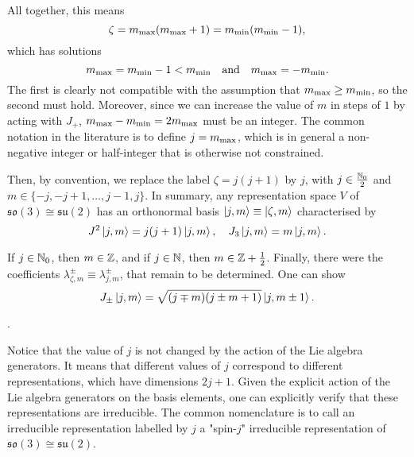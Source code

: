 All together, this means
\begin{equation}
    \zeta = m_\textup{max} (m_\textup{max} + 1) = m_\textup{min} (m_\textup{min} - 1),
\end{equation}
which has solutions
\begin{equation*}
    m_\textup{max} = m_\textup{min} - 1 < m_\textup{min} \quad \textup{and} \quad m_\textup{max} = - m_\textup{min}.
\end{equation*}
The first is clearly not compatible with the assumption that $m_\textup{max} \geq m_\textup{min}$, so the second must hold. Moreover, since we can increase the value of $m$ in steps of $1$ by acting with $J_+$, $m_\textup{max} - m_\textup{min} = 2 m_\textup{max}$ must be an integer. The common notation in the literature is to define $j = m_\textup{max}$, which is in general a non-negative integer or half-integer that is otherwise not constrained.

Then, by convention, we replace the label $\zeta = j (j+1)$ by $j$, with $j \in \frac{\mathbb{N}_0}{2}$ and $m \in \{ -j, -j+1, \dots, j-1, j \}$. In summary, any representation space $V$ of $\mathfrak{so}(3) \cong \mathfrak{su}(2)$ has an orthonormal basis $\ket{j,m} \equiv \ket{\zeta, m}$ characterised by
\begin{equation}
    J^2 \ket{j,m} = j(j+1) \ket{j,m}, \quad J_3 \ket{j,m} = m \ket{j,m} .
\end{equation}

If $j \in \mathbb{N}_0$, then $m \in \mathbb{Z}$, and if $j \in \mathbb{N}$, then $m \in \mathbb{Z} + \frac{1}{2}$. Finally, there were the coefficients $\lambda^\pm_{\zeta, m} \equiv \lambda^\pm_{j,m}$, that remain to be determined. One can show
\begin{equation}
    J_\pm \ket{j,m} = \sqrt{(j \mp m)(j \pm m + 1)} \ket{j,m \pm 1} .
\end{equation}
\begin{mdframed}
\begin{innerproof}
    .
\end{innerproof}
\end{mdframed}

Notice that the value of $j$ is not changed by the action of the Lie algebra generators. It means that different values of $j$ correspond to different representations, which have dimensions $2j +1$. Given the explicit action of the Lie algebra generators on the basis elements, one can explicitly verify that these representations are irreducible. The common nomenclature is to call an irreducible representation labelled by $j$ a "spin-$j$" irreducible representation of $\mathfrak{so}(3) \cong \mathfrak{su}(2)$.

